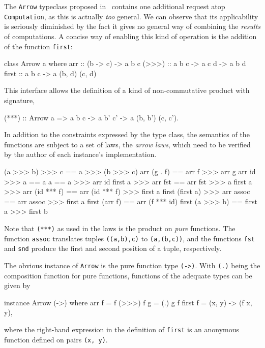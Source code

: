 The \verb|Arrow| typeclass proposed in~\cite{hughes-monad2arr} contains one
additional request atop \linebreak\verb|Computation|, as this is actually
\emph{too} general. We can observe that its applicability is seriously
diminished by the fact it gives no general way of combining the \emph{results}
of computations. A concise way of enabling this kind of operation is the
addition of the function \verb|first|:

\begin{code}
  class Arrow a where
      arr   :: (b -> c) -> a b c
      (>>>) :: a b c -> a c d -> a b d
      first :: a b c -> a (b, d) (c, d)
\end{code}

This interface allows the definition of a kind of non-commutative product with
signature,

\begin{code}
  (***) :: Arrow a => a b c -> a b' c' -> a (b, b') (c, c')\textrm{.}
\end{code}

In addition to the constraints expressed by the type class, the semantics of the
functions are subject to a set of laws, the \emph{arrow laws}, which need to be
verified by the author of each instance's implementation.

\begin{code}[numbers=left]
                (a >>> b) >>> c == a >>> (b >>> c)
                    arr (g . f) == arr f >>> arr g
                   arr id >>> a == a
                              a == a >>> arr id
            first a >>> arr fst == arr fst >>> a
     first a >>> arr (id *** f) == arr (id *** f) >>> first a
  first (first a) >>> arr assoc == arr assoc >>> first a
                  first (arr f) == arr (f *** id)
                first (a >>> b) == first a >>> first b
\end{code}

Note that \verb|(***)| as used in the laws is the product on \emph{pure}
functions. The function \verb|assoc| translates tuples \verb|((a,b),c)| to
\verb|(a,(b,c))|, and the functions \verb|fst| and \verb|snd| produce the first
and second position of a tuple, respectively.

The obvious instance of \verb|Arrow| is the pure function type \verb|(->)|. With
\verb|(.)| being the composition function for pure functions, functions of the
adequate types can be given by

\begin{code}
  instance Arrow (->) where
      arr f     = f
      (>>>) f g = (.) g f
      first f   = (x, y) -> (f x, y)\textrm{,}
\end{code}

where the right-hand expression in the definition of \verb|first| is an
anonymous function defined on pairs \verb|(x, y)|.

